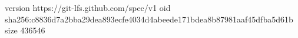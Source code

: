 version https://git-lfs.github.com/spec/v1
oid sha256:c8836d7a2bba29dea893ecfe4034d4abeede171bdea8b87981aaf45dfba5d61b
size 436546

